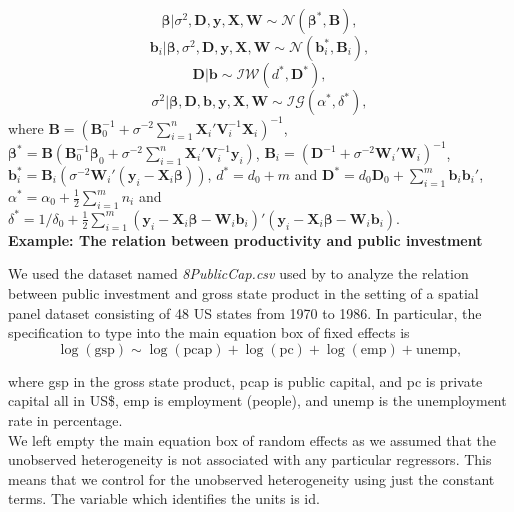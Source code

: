 \begin{equation*}\label{eq:19}
	\bm{\beta}|\sigma^2,\bm{D},\bm{y}, \bm{X}, \bm{W} \sim \mathcal{N}(\bm{\beta}^*,\bm{B}), 
\end{equation*}
\begin{equation*}\label{eq:20}
	\bm{b}_i|\bm{\beta},\sigma^2,\bm{D},\bm{y}, \bm{X}, \bm{W} \sim \mathcal{N}(\bm{b}_i^*,\bm{B}_i), 
\end{equation*}
\begin{equation*}\label{eq:21}
	\bm{D}| \bm{b} \sim \mathcal{I}\mathcal{W}(d^*, \bm{D}^*),
\end{equation*}
\begin{equation*}\label{eq:22}
	\sigma^2| \bm{\beta}, \bm{D}, \bm{b}, \bm{y}, \bm{X}, \bm{W} \sim \mathcal{I}\mathcal{G}(\alpha^*, \delta^*),
\end{equation*}
\noindent where $\bm{B} = (\bm{B}_0^{-1} +\sigma^{-2}\sum_{i=1}^n \bm{X}_i'\bm{V}_i^{-1}\bm{X}_i)^{-1}$, $\bm{\beta}^*= \bm{B}(\bm{B}_0^{-1}\bm{\beta}_0 +\sigma^{-2} \sum_{i=1}^n\bm{X}_i'\bm{V}_i^{-1}\bm{y}_i)$, $\bm{B}_i = (\bm{D}^{-1} +\sigma^{-2} \bm{W}_i'\bm{W}_i)^{-1}$, $\bm{b}_i^*= \bm{B}_i(\sigma^{-2} \bm{W}_i'(\bm{y}_i-\bm{X}_i\bm{\beta}))$, $d^* = d_0 + m$ and $\bm{D}^* = d_0\bm{D}_0 + \sum_{i=1}^m \bm{b}_i\bm{b}_i'$, $\alpha^*=\alpha_0+\frac{1}{2}\sum_{i=1}^m n_i$ and $\delta^*=1/\delta_0+\frac{1}{2}\sum_{i=1}^m(\bm{y}_i-\bm{X}_i\bm{\beta}-\bm{W}_i\bm{b}_i)'(\bm{y}_i-\bm{X}_i\bm{\beta}-\bm{W}_i\bm{b}_i)$.\\ 

\textbf{Example: The relation between productivity and public investment}

We used the dataset named \textit{8PublicCap.csv} used by \cite{Ramirez2017} to analyze the relation  between public investment and gross state product in the setting of a spatial panel dataset consisting of 48 US states from 1970 to 1986.
In particular, the specification to type into the main equation box of fixed effects is
$$\log(\text{gsp})\sim\log(\text{pcap})+\log(\text{pc})+\log(\text{emp})+\text{unemp},$$

\noindent where gsp in the gross state product, pcap is public capital, and pc is private capital all in US\$, emp is employment (people), and unemp is the unemployment rate in percentage.\\

We left empty the main equation box of random effects as we assumed that the unobserved heterogeneity is not associated with any particular regressors.
This means that we control for the unobserved heterogeneity using just the constant terms.
The variable which identifies the units is id.\\

